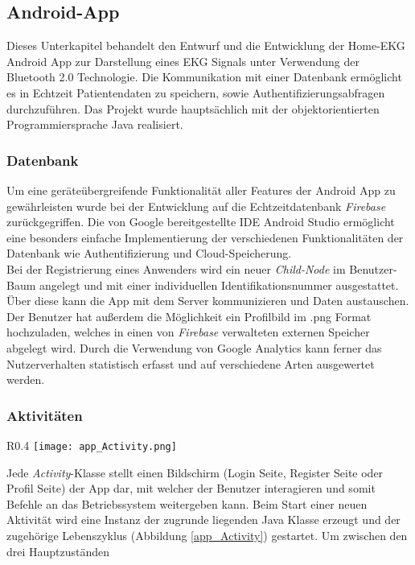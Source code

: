 \subsection{Android-App}
Dieses Unterkapitel behandelt den Entwurf und die Entwicklung der Home-EKG Android App zur Darstellung eines EKG Signals unter Verwendung der Bluetooth 2.0 Technologie. Die Kommunikation mit einer Datenbank ermöglicht es in Echtzeit Patientendaten zu speichern, sowie Authentifizierungsabfragen durchzuführen. Das Projekt wurde hauptsächlich mit der objektorientierten Programmiersprache Java realisiert. 

\subsubsection{Datenbank}
Um eine geräteübergreifende Funktionalität aller Features der Android App zu gewährleisten wurde bei der Entwicklung auf die Echtzeitdatenbank \textit{Firebase} \cite{Firebase}  zurückgegriffen. Die von Google bereitgestellte IDE Android Studio \cite{Android_Studio} ermöglicht eine besonders einfache Implementierung der verschiedenen Funktionalitäten der Datenbank wie Authentifizierung und Cloud-Speicherung. \\
Bei der Registrierung eines Anwenders wird ein neuer \textit{Child-Node} im Benutzer-Baum angelegt und mit einer individuellen Identifikationsnummer ausgestattet. Über diese kann die App mit dem Server kommunizieren und Daten austauschen. \\
Der Benutzer hat außerdem die Möglichkeit ein Profilbild im .png Format hochzuladen, welches in einen von \textit{Firebase} verwalteten externen Speicher abgelegt wird. Durch die Verwendung von Google Analytics \cite{Google_Analytics} kann ferner das Nutzerverhalten statistisch erfasst und auf verschiedene Arten ausgewertet werden. 

\subsubsection{Aktivitäten}

\begin{wrapfigure}[14]{R}{0.4\textwidth}
\vspace{-25pt}
\texttt{[image: app\_Activity.png]}
\caption{Lebenszyklus}
\label{app_Activity}
\end{wrapfigure}

Jede \textit{Activity}-Klasse \cite{Activity_Overview} stellt einen Bildschirm (Login Seite, Register Seite oder Profil Seite) der App dar, mit welcher der Benutzer interagieren und somit Befehle an das Betriebssystem weitergeben kann. Beim Start einer neuen Aktivität wird eine Instanz der zugrunde liegenden Java Klasse erzeugt und der zugehörige Lebenszyklus (Abbildung \ref{app_Activity}) gestartet. \cite{Activity_Lifecycle}
Um zwischen den drei Hauptzuständen

